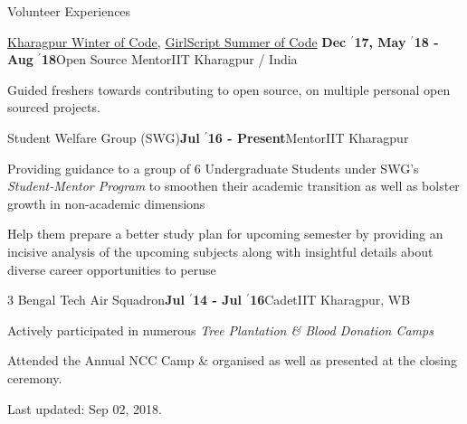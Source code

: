 \documentclass{resume} %
\begin{document}
\begin{rSection}{Volunteer Experiences}

\begin{rSubsection}{\large \href{https://kwoc.kossiitkgp.in/}{Kharagpur Winter of Code}, \href{https://gssoc.tech/projects.html\#facebook-archive}{GirlScript Summer of Code}}{\textbf{ Dec $^{\prime}$17, May $^{\prime}$18 - Aug $^{\prime}$18}}{Open Source Mentor}{IIT Kharagpur / India}
\item Guided freshers towards contributing to open source, on multiple personal open sourced projects.
\end{rSubsection}

\begin{rSubsection}{\large Student Welfare Group (SWG)}{\textbf{\large Jul $^{\prime}$16 - Present}}{Mentor}{IIT Kharagpur}
\item Providing guidance to a group of 6 Undergraduate Students under SWG's \textit{Student-Mentor Program} to smoothen their academic transition as well as bolster growth in non-academic dimensions
\item Help them prepare a better study plan for upcoming semester by providing an incisive analysis of the upcoming subjects along with insightful details about diverse career opportunities to peruse
\end{rSubsection}

\begin{rSubsection}{\large 3 Bengal Tech Air Squadron}{\textbf{\large Jul $^{\prime}$14 - Jul $^{\prime}$16}}{Cadet}{IIT Kharagpur, WB}
\item Actively participated in numerous \textit{Tree Plantation \& Blood Donation Camps}
\item Attended the Annual NCC Camp \& organised as well as presented at the closing ceremony.
\end{rSubsection}



\end{rSection}

	\vspace*{\fill}
	\begin{flushright}
	\footnotesize Last updated: Sep 02, 2018.
	\end{flushright}
\end{document}

